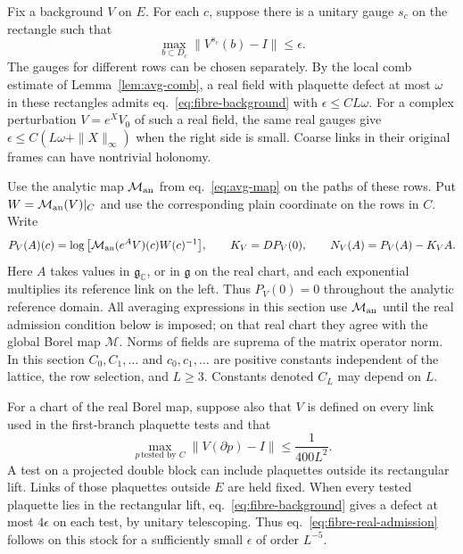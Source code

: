 \documentclass[11pt,letterpaper,reqno]{amsart}
\numberwithin{equation}{section}
\renewcommand{\eqref}[1]{\textup{eq.~\ref{#1}}}
\theoremstyle{definition}
\theoremstyle{remark}
\begin{document}
Fix a background $V$ on $E$. For each $c$, suppose there is a unitary
gauge $s_c$ on the rectangle such that
\begin{equation}\label{eq:fibre-background}
 \max_{b\subset D_c}\|V^{s_c}(b)-I\|\le\epsilon.
\end{equation}
The gauges for different rows can be chosen separately. By the local comb
estimate of Lemma~\ref{lem:avg-comb}, a real field with plaquette defect at
most $\omega$ in these rectangles admits \eqref{eq:fibre-background} with
$\epsilon\le C L\omega$. For a complex perturbation $V=e^XV_0$ of such a real
field, the same real gauges give $\epsilon\le C(L\omega+\|X\|_\infty)$ when
the right side is small. Coarse links in their original frames can have
nontrivial holonomy.

Use the analytic map \(\mathcal M_{\rm an}\) from \eqref{eq:avg-map}
on the paths of these rows. Put
$W=\mathcal M_{\rm an}(V)|_C$ and use the corresponding plain coordinate
on the rows in $C$. Write
\begin{equation}\label{eq:fibre-constraint}
 P_V(A)(c)=\log\big[\mathcal M_{\rm an}(e^A V)(c)W(c)^{-1}\big],\qquad
 K_V=DP_V(0),\qquad N_V(A)=P_V(A)-K_VA.
\end{equation}
Here $A$ takes values in $\mathfrak g_\mathbb C$, or in $\mathfrak g$ on the
real chart, and each exponential multiplies its reference link on the left.
Thus $P_V(0)=0$ throughout the analytic reference domain. All averaging
expressions in this section use $\mathcal M_{\rm an}$ until the real
admission condition below is imposed; on that real chart they agree with
the global Borel map $\mathcal M$. Norms of fields are suprema of the
matrix operator norm.
In this section $C_0,C_1,\ldots$ and $c_0,c_1,\ldots$ are positive constants
independent of the lattice, the row selection, and $L\ge3$. Constants denoted
$C_L$ may depend on $L$.

For a chart of the real Borel map, suppose also that $V$ is defined on every
link used in the first-branch plaquette tests and that
\begin{equation}\label{eq:fibre-real-admission}
 \max_{p\,\text{tested by } C}\|V(\partial p)-I\|
 \le \frac1{400L^2}.
\end{equation}
A test on a projected double block can include plaquettes outside its
rectangular lift. Links of those plaquettes outside $E$ are held fixed.
When every tested plaquette lies in the rectangular lift,
\eqref{eq:fibre-background} gives a defect at most \(4\epsilon\)
on each test, by unitary telescoping. Thus
\eqref{eq:fibre-real-admission} follows on this stock for a
sufficiently small \(\epsilon\) of order \(L^{-5}\).
\end{document}
